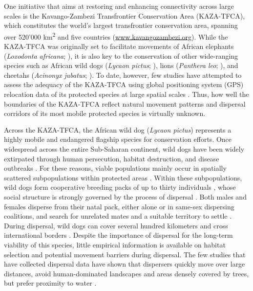 \documentclass[abstract=on,10pt,a4paper,bibliography=totocnumbered]{article}
\begin{document}
One initiative that aims at restoring and enhancing connectivity across large
scales is the Kavango-Zambezi Transfrontier Conservation Area (KAZA-TFCA), which
constitutes the world's largest transfrontier conservation area, spanning over
520'000 km\textsuperscript{2} and five countries (\url{www.kavangozambezi.org}).
While the KAZA-TFCA was originally set to facilitate movements of African
elephants (\textit{Loxodonta africana}; \citealp{Tshipa.2017}), it is also key
to the conservation of other wide-ranging species such as African wild dogs
(\textit{Lycaon pictus}; \citealp{Woodroffe.2012, Cozzi.2020}), lions
(\textit{Panthera leo}; \citealp{Elliot.2014, Cushman.2018}), and cheetahs
(\textit{Acinonyx jubatus}; \citealp{Weise.2017}). To date, however, few studies
have attempted to assess the adequacy of the KAZA-TFCA using global positioning
system (GPS) relocation data of its protected species at large spatial scales
\citep{Elliot.2014, Tshipa.2017, Brennan.2020}. Thus, how well the boundaries of
the KAZA-TFCA reflect natural movement patterns and dispersal corridors of its
most mobile protected species is virtually unknown.

Across the KAZA-TFCA, the African wild dog (\textit{Lycaon pictus}) represents a
highly mobile and endangered flagship species for conservation efforts. Once
widespread across the entire Sub-Saharan continent, wild dogs have been widely
extirpated through human persecution, habitat destruction, and disease outbreaks
\citep{Woodroffe.2012}. For these reasons, viable populations mainly occur in
spatially scattered subpopulations within protected areas \citep{Woodroffe.1999,
Woodroffe.2012, VanDerMeer.2014}. Within these subpopulations, wild dogs form
cooperative breeding packs of up to thirty individuals \citep{Creel.2002}, whose
social structure is strongly governed by the process of dispersal
\citep{McNutt.1996, Behr.2020}. Both males and females disperse from their natal
pack, either alone or in same-sex dispersing coalitions, and search for
unrelated mates and a suitable territory to settle \citep{McNutt.1996,
Cozzi.2020, Behr.2020}. During dispersal, wild dogs can cover several hundred
kilometers and cross international borders \citep{Masenga.2016, Woodroffe.2019,
Cozzi.2020}. Despite the importance of dispersal for the long-term viability of
this species, little empirical information is available on habitat selection and
potential movement barriers during dispersal. The few studies that have
collected dispersal data have shown that dispersers quickly move over large
distances, avoid human-dominated landscapes and areas densely covered by trees,
but prefer proximity to water \citep{Masenga.2016, Woodroffe.2019, Oneill.2020,
Cozzi.2020}.
\end{document}
